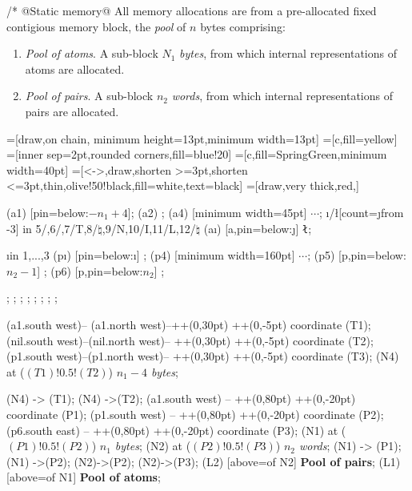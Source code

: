 \documentclass[12pt]{article}
\newenvironment{layout}{\quote
\tikzpicture[start chain=going right,x=20pt,y=14pt]
   \tikzset{pin distance=9pt}
   \tikzstyle{c}=[draw,on chain, minimum height=13pt,minimum width=13pt]
   \tikzstyle{a}=[c,fill=yellow]
   \tikzstyle{h}=[inner sep=2pt,rounded corners,fill=blue!20]
   \tikzstyle{p}=[c,fill=SpringGreen,minimum width=40pt]
   \tikzstyle{m}=[<->,draw,shorten >=3pt,shorten <=3pt,thin,olive!50!black,fill=white,text=black]
   \tikzstyle{u}=[draw,very thick,red,]
   \scriptsize%
}
{\endtikzpicture\endquote}
\begin{document}
\begin{code}[literate=
    {*}{$\times$}{1}
    {=}{$\equiv$ }{1}{*}{$\times$}{1}
    {1<<13}{$2^{13}$}{3}
    {1<<15}{$2^{15}$}{3}
    {1a<<$H_x$}{$2^{H_x}$}{3}
]
/* @Static memory@ 
All memory allocations are from a pre-allocated fixed 
contigious memory block, the \emph{pool} of $n$ bytes comprising:
\begin{enumerate} 
\item \emph{Pool of atoms}. A sub-block $N_1$ \emph{bytes}, from which 
internal representations of atoms are allocated. 
\item \emph{Pool of pairs}. A sub-block $n_2$ \emph{words},
from which internal representations of pairs are allocated. 
\end{enumerate}

\begin{layout}
\node[a] (a1) [pin=below:$-n_1+4$]{};
\node[a] (a2) {};
\node[a] (a4) [minimum width=45pt] {$\cdots$};
\foreach \i/\l[count=\j from -3] in {5/,6/,7/T,8/$\natural$,9/N,10/I,11/L,12/$\natural$} \node (a\i) [a,pin=below:{\j}] {\tt\l};

\foreach \i in {1,...,3} \node[p] (p\i) [pin=below:{\i}] {};
\node[p] (p4) [minimum width=160pt] {$\cdots$};
\node[p] (p5) [p,pin=below:{$n_2-1$}] {};
\node[p] (p6) [p,pin=below:{$n_2$}] {};

;
;
\node[p,draw,fill=olive!30,above=of p1,pin=above:1] {};
\node[p,draw,fill=olive!30,above=of p2,pin=above:2] {};
\node[p,draw,fill=olive!30,above=of p3,pin=above:2] {};
\node[p,draw,fill=olive!30,above=of p4,minimum width=160pt] {};
\node[p,draw,fill=olive!30,above=of p5,pin=above:$n_2-1$] {};
\node[p,draw,fill=olive!30,above=of p6,pin=above:$n_2$] {};

 (a1.south west)-- (a1.north west)--++(0,30pt) ++(0,-5pt) coordinate (T1);
 (nil.south west)--(nil.north west)-- ++(0,30pt) ++(0,-5pt) coordinate (T2);
 (p1.south west)--(p1.north west)-- ++(0,30pt) ++(0,-5pt) coordinate (T3);
\node (N4) at ($(T1)!0.5!(T2)$) {\it$n_1-4$ bytes};

\draw[m] (N4) -> (T1);
\draw[m] (N4) ->(T2);
 (a1.south west) -- ++(0,80pt) ++(0,-20pt) coordinate (P1);
 (p1.south west) -- ++(0,80pt) ++(0,-20pt) coordinate (P2);
 (p6.south east) -- ++(0,80pt) ++(0,-20pt) coordinate (P3);
\node (N1) at ($(P1)!0.5!(P2)$) {\it$n_1$ bytes};
\node (N2) at ($(P2)!0.5!(P3)$) {\it$n_2$ words};
\draw[m] (N1) -> (P1);
\draw[m] (N1) ->(P2);
\draw[m] (N2)->(P2);
\draw[m] (N2)->(P3); 
\node(L2) [above=of N2]  {\bf Pool of pairs}; 
\node(L1) [above=of N1]  {\bf Pool of atoms}; 


\end{layout}
\end{code}
\end{document}
